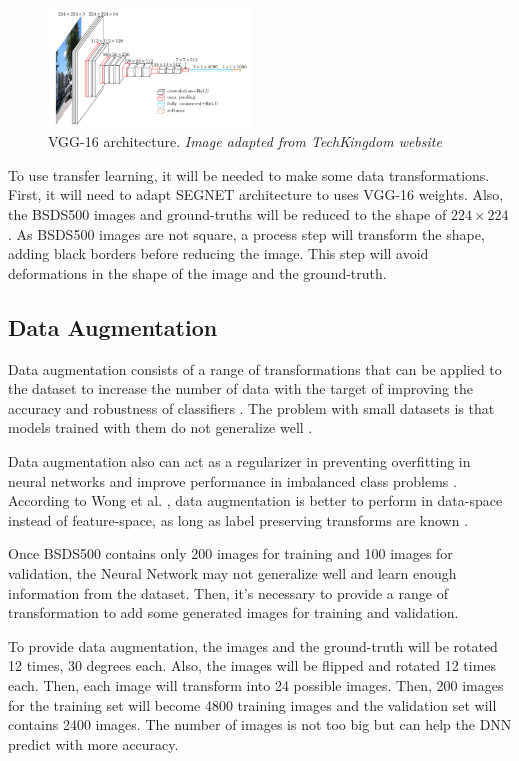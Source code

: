 \documentclass[10pt,twocolumn,letterpaper]{article}
\begin{document}
\begin{figure}[ht]
  \centering
  \includegraphics[width=0.48\textwidth]{vgg16.png}
  \caption{VGG-16 architecture. \textit{Image adapted from TechKingdom website\cite{VGG16_IMG}}}
  \label{fig:vgg16}
\end{figure}

To use transfer learning, it will be needed to make some data transformations. First, it will need to adapt SEGNET architecture to uses VGG-16 weights. Also, the BSDS500 images and ground-truths will be reduced to the shape of $ 224 \times 224$. As BSDS500 images are not square, a process step will transform the shape, adding black borders before reducing the image. This step will avoid deformations in the shape of the image and the ground-truth.

\subsection{Data Augmentation} \label{ssec:data_augmentation}

Data augmentation consists of a range of transformations that can be applied to the dataset to increase the number of data with the target of improving the accuracy and robustness of classifiers \cite{AUGM_ADAPT}. The problem with small datasets is that models trained with them do not generalize well \cite{AUGM_DEEP}.

Data augmentation also can act as a regularizer in preventing overfitting in neural networks and improve performance in imbalanced class problems \cite{DATA_AUGM}. According to Wong et al. \cite{DATA_AUGM}, data augmentation is better to perform in data-space instead of feature-space, as long as label preserving transforms are known \cite{DATA_AUGM}.

Once BSDS500 contains only 200 images for training and 100 images for validation, the Neural Network may not generalize well and learn enough information from the dataset. Then, it's necessary to provide a range of transformation to add some generated images for training and validation.

To provide data augmentation, the images and the ground-truth will be rotated 12 times, 30 degrees each. Also, the images will be flipped and rotated 12 times each. Then, each image will transform into 24 possible images. Then, 200 images for the training set will become 4800 training images and the validation set will contains 2400 images. The number of images is not too big but can help the DNN predict with more accuracy.


{\small


}
\end{document}
